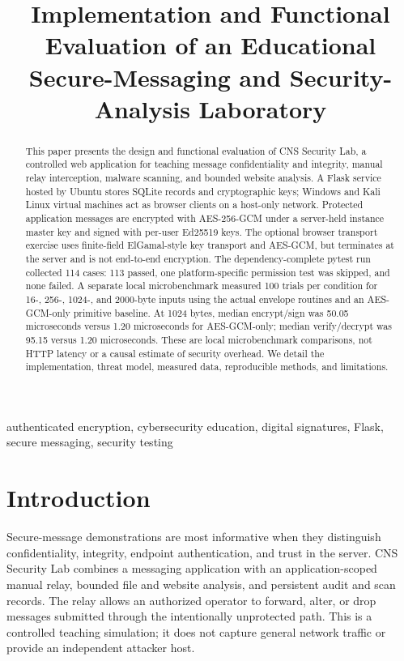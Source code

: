 \documentclass[conference]{IEEEtran}
\begin{document}
\title{Implementation and Functional Evaluation of an Educational Secure-Messaging and Security-Analysis Laboratory}

\author{
}

\maketitle

\begin{abstract}
This paper presents the design and functional evaluation of CNS Security Lab, a controlled web application for teaching message confidentiality and integrity, manual relay interception, malware scanning, and bounded website analysis. A Flask service hosted by Ubuntu stores SQLite records and cryptographic keys; Windows and Kali Linux virtual machines act as browser clients on a host-only network. Protected application messages are encrypted with AES-256-GCM under a server-held instance master key and signed with per-user Ed25519 keys. The optional browser transport exercise uses finite-field ElGamal-style key transport and AES-GCM, but terminates at the server and is not end-to-end encryption. The dependency-complete pytest run collected 114 cases: 113 passed, one platform-specific permission test was skipped, and none failed. A separate local microbenchmark measured 100 trials per condition for 16-, 256-, 1024-, and 2000-byte inputs using the actual envelope routines and an AES-GCM-only primitive baseline. At 1024 bytes, median encrypt/sign was 50.05 microseconds versus 1.20 microseconds for AES-GCM-only; median verify/decrypt was 95.15 versus 1.20 microseconds. These are local microbenchmark comparisons, not HTTP latency or a causal estimate of security overhead. We detail the implementation, threat model, measured data, reproducible methods, and limitations.
\end{abstract}

\begin{IEEEkeywords}
authenticated encryption, cybersecurity education, digital signatures, Flask, secure messaging, security testing
\end{IEEEkeywords}

\section{Introduction}
Secure-message demonstrations are most informative when they distinguish confidentiality, integrity, endpoint authentication, and trust in the server. CNS Security Lab combines a messaging application with an application-scoped manual relay, bounded file and website analysis, and persistent audit and scan records. The relay allows an authorized operator to forward, alter, or drop messages submitted through the intentionally unprotected path. This is a controlled teaching simulation; it does not capture general network traffic or provide an independent attacker host.
\end{document}
